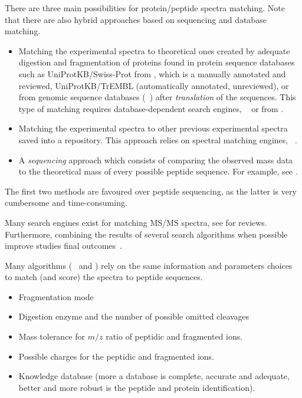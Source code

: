 There are three main possibilities for protein/peptide spectra matching.
Note that there are also hybrid approaches based on  sequencing and
database matching.
\begin{itemize}
    \item Matching the experimental spectra to theoretical ones created by
        adequate  digestion
        and fragmentation of proteins found in protein sequence databases such as
        UniProtKB/Swiss-Prot from ,
        which is a manually annotated and reviewed,
        UniProtKB/TrEMBL (automatically annotated, unreviewed), or
        from genomic sequence databases (\eg\ )
        after \emph{ translation} of the sequences.
        This type of matching requires database-dependent search engines,
        \eg\ 
        or  from .
    \item Matching the experimental spectra to other previous experimental spectra
        saved into a repository.
        This approach relies on spectral matching engines,
        \eg\ .
    \item A  \emph{sequencing} approach which consists of
        comparing the observed mass data to the theoretical mass
        of every possible peptide sequence.
        For example, see .
\end{itemize}

The first two methods are favoured over  peptide sequencing,
as the latter is very cumbersome and time-consuming.

Many search engines exist for matching \gls{MS/MS} spectra,
see \citet{Griss2016,Shteynberg2013,Eng2011} for reviews.
Furthermore\label{seg:moreAlgoisbetter},
combining the results of several search algorithms when possible improve
studies final outcomes~.

Many algorithms (\eg\  and ) rely on
the same information and parameters choices to match
(and score) the spectra to peptide sequences.
\begin{itemize}[topsep=0pt,nosep]
    \item Fragmentation mode
    \item Digestion enzyme and the number of possible omitted cleavages
    \item Mass tolerance for $m/z$ ratio of peptidic and fragmented ions.
    \item Possible charges for the peptidic and fragmented ions.
    \item Knowledge database (more a database is complete, accurate and adequate,
        better and more robust is the peptide and protein identification).
\end{itemize}

